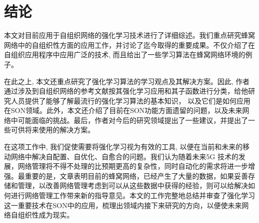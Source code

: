 ﻿\documentclass[11pt,draftclsnofoot,onecolumn,journal,letterpaper]{IEEEtran}
\begin{document}
\section{结论}
\label{sec:Conclusion}

本文对目前应用于自组织网络的强化学习技术进行了详细综述。我们重点研究蜂窝网络中的自组织性方面的应用工作，并讨论了迄今取得的重要成果。不仅介绍了在自组织应用程序中应用广泛的技术, 而且给出了一些学习算法在蜂窝网络环境的例子。

在此之上, 本文还重点研究了强化学习算法的学习观点及其解决方案。因此, 作者通过涉及到自组织网络的参考文献按其强化学习应用和其子函数进行分类，给他研究人员提供了能够了解最流行的强化学习算法的基本知识， 以及它们是如何应用在SON领域。此外，本文还介绍了目前在SON功能方面遗留的问题，以及未来网络中可能面临的挑战。最后，作者对今后的研究领域提出了一些建议，并提出了一些可供将来使用的解决方案。

在这项工作中, 我们促使需要将强化学习视为有效的工具, 以便在当前和未来的移动网络中解决自配置、自优化、自愈合的问题。我们认为随着未来5G 技术的发展，网络管理将不得不处理的比预期更高的复杂性，同时自动化的需求将进一步增强。最重要的是，文章表明目前的蜂窝网络，已经产生了大量的数据，如果妥善存储和管理，以改善网络管理考虑到可以从这些数据中获得的经验，则可以给解决如何进行网络管理工作带来新的指导意见。本文的工作完整地总结并审查了强化学习这一重要技术在SON中的应用，梳理出领域内接下来研究的方向，以便使未来网络自组织性成为现实。




\end{document}
